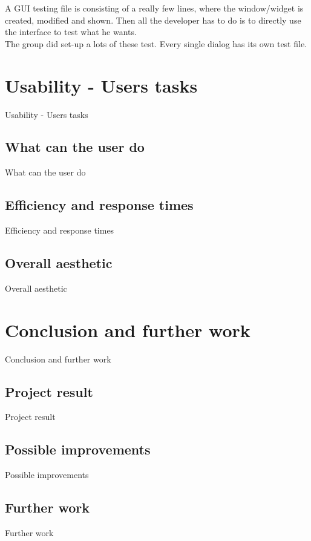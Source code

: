 A GUI testing file is consisting of a really few lines, where the window/widget is created, modified and shown. Then all the developer has to do is to directly use the interface to test what he wants.\\
The group did set-up a lots of these test. Every single dialog has its own test file.

\part{Usability - Users tasks}
Usability - Users tasks

\chapter{What can the user do}
What can the user do


\chapter{Efficiency and response times}
Efficiency and response times

\chapter{Overall aesthetic}
Overall aesthetic

\part{Conclusion and further work}
Conclusion and further work

\chapter{Project result}
Project result

\chapter{Possible improvements}
Possible improvements

\chapter{Further work}
Further work
